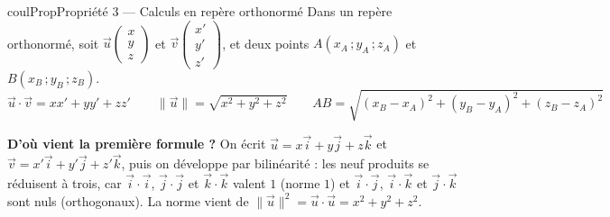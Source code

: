 \documentclass[11pt,a4paper]{article}
\makeatletter
\newcommand{\vect}[1]{\overrightarrow{#1}}
\newcounter{lycee@signet}
\newcommand{\signet}[3][]{\stepcounter{lycee@signet}%
  \edef\lycee@dest{\if\relax\detokenize{#1}\relax
    signet.\arabic{lycee@signet}\else#1\fi}%
  \hypertarget{\lycee@dest}{}\bookmark[level=#2,dest=\lycee@dest]{#3}}
\newenvironment{proprietebox}[1][Propriété]%
  {\begin{boitecours}[phantom={\signet{2}{#1}}]{coulProp}{#1}}{\end{boitecours}}
\makeatother
\begin{document}
\begin{proprietebox}[Propriété 3 --- Calculs en repère orthonormé]
Dans un repère orthonormé, soit $\vect{u}\begin{pmatrix}x\\y\\z\end{pmatrix}$ et
$\vect{v}\begin{pmatrix}x'\\y'\\z'\end{pmatrix}$, et deux points $A(x_{A}\,;y_{A}\,;z_{A})$ et $B(x_{B}\,;y_{B}\,;z_{B})$.
\[
\vect{u}\cdot\vect{v}=xx'+yy'+zz'
\qquad
\|\vect{u}\|=\sqrt{x^{2}+y^{2}+z^{2}}
\qquad
AB=\sqrt{(x_{B}-x_{A})^{2}+(y_{B}-y_{A})^{2}+(z_{B}-z_{A})^{2}}
\]
\end{proprietebox}

\textbf{D'où vient la première formule ?} On écrit $\vect{u}=x\vect{i}+y\vect{j}+z\vect{k}$
et $\vect{v}=x'\vect{i}+y'\vect{j}+z'\vect{k}$, puis on développe par bilinéarité : les
neuf produits se réduisent à trois, car $\vect{i}\cdot\vect{i}$, $\vect{j}\cdot\vect{j}$ et $\vect{k}\cdot\vect{k}$ valent $1$
(norme $1$) et $\vect{i}\cdot\vect{j}$, $\vect{i}\cdot\vect{k}$ et $\vect{j}\cdot\vect{k}$ sont nuls (orthogonaux).
La norme vient de $\|\vect{u}\|^{2}=\vect{u}\cdot\vect{u}=x^{2}+y^{2}+z^{2}$.
\end{document}

